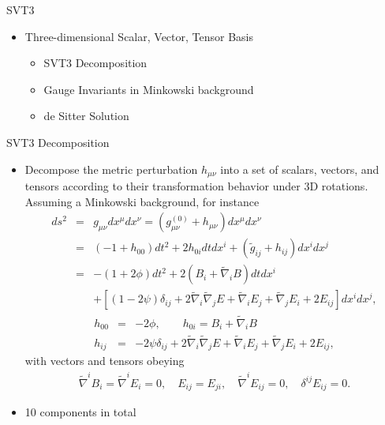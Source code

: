 \documentclass[8pt]{beamer}
\begin{document}
\begin{frame}{SVT3}
	\begin{itemize}
		\item Three-dimensional Scalar, Vector, Tensor Basis
		\begin{itemize}
			\item SVT3 Decomposition
			\item Gauge Invariants in Minkowski background
			\item de Sitter Solution
		\end{itemize}
	\end{itemize}
\end{frame}


\begin{frame}{SVT3 Decomposition}
	\begin{itemize}
		\item Decompose the metric perturbation $h_{\mu\nu}$ into a set of scalars, vectors, and tensors according to their transformation behavior under 3D rotations. Assuming a Minkowski background, for instance
		\begin{eqnarray*}
			ds^2 &=& g_{\mu\nu}dx^\mu dx^\nu = (g_{\mu\nu}^{(0)} + h_{\mu\nu})dx^\mu dx^\nu
			\\
			&=& (-1+h_{00})dt^2 + 2h_{0i}dtdx^i + (\tilde g_{ij} + h_{ij})dx^i dx^j
			\\
			&=& -(1+2\phi)dt^2 + 2(B_i + \tilde\nabla_i B)dt dx^i 
			\\&&+ [(1-2\psi)\delta_{ij} + 2\tilde\nabla_i \tilde\nabla_j E + \tilde\nabla_i E_j + \tilde\nabla_j E_i + 2E_{ij}]dx^i dx^j,
		\end{eqnarray*}
		\begin{eqnarray*}
			h_{00} &=& -2\phi,\qquad h_{0i} = B_i + \tilde\nabla_i B
			\\
			h_{ij} &=& -2\psi \delta_{ij} + 2\tilde\nabla_i \tilde\nabla_j E + \tilde\nabla_i E_j + \tilde\nabla_j E_i + 2E_{ij},
		\end{eqnarray*}
		with vectors and tensors obeying
		\begin{eqnarray*}
			\tilde\nabla^i B_i = \tilde\nabla^i E_i = 0,\quad E_{ij} = E_{ji},\quad\tilde\nabla^i E_{ij} = 0,\quad \delta^{ij}E_{ij} = 0.
		\end{eqnarray*}
	\item 10 components in total
	\end{itemize}
\end{frame}
\end{document}
